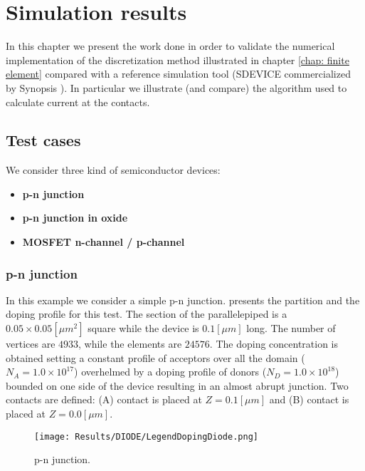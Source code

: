 \chapter{Simulation results}

In this chapter we present the work done in order to validate the numerical implementation of the discretization method illustrated in chapter \ref{chap: finite element} compared with a reference simulation tool (SDEVICE commercialized by Synopsis \cite{SdeviceManual}).
In particular we illustrate (and compare) the algorithm used to calculate current at the contacts.

\section{Test cases}

We consider three kind of semiconductor devices: 

\begin{itemize}
\setlength{\itemsep}{0.5pt}
\item {\bf p-n junction}
\item {\bf p-n junction in oxide}
\item {\bf MOSFET n-channel / p-channel}
\end{itemize}

\subsection{p-n junction}
\label{sec: PN}

In this example we consider a simple p-n junction.  presents the partition and the doping profile for this test. The section of the parallelepiped is a $0.05 \times 0.05 [\mu m^2]$ square while the device is $0.1 [\mu m]$ long.  The number of vertices are $4933$, while the elements are $24576$.  The doping concentration is obtained setting a constant profile of acceptors over all the domain ($N_A = 1.0\times 10^{17}$) overhelmed by a doping profile of  donors ($N_D=1.0 \times 10^{18}$) bounded on one side of the device resulting in an almost abrupt junction. 
Two contacts are defined: (A) contact is placed at $Z=0.1[\mu m]$ and (B) contact is placed at $Z=0.0 [\mu m]$.  


\begin{figure}[!t]
\centering
{}
\hspace{0.06\textwidth}
\hspace{0.04\textwidth}
{\texttt{[image: Results/DIODE/LegendDopingDiode.png]}}
\caption{p-n junction.}
\label{fig: diodo struttura}
\end{figure}


